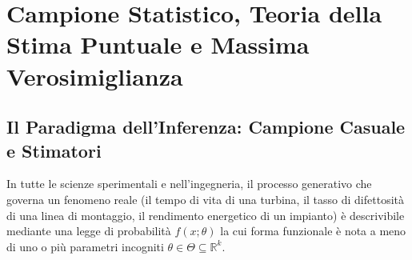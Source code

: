 \chapter{Campione Statistico, Teoria della Stima Puntuale e Massima Verosimiglianza}
\label{cap:campione_statistico_e_stimatori}

\begin{abstract}
Il presente capitolo segna il passaggio concettuale dall'analisi probabilistica diretta (deduttiva: dal modello teorico ai dati attesi) all'inferenza statistica (induttiva: dai dati empirici osservati alla stima dei parametri incogniti del modello). Viene formalizzata la nozione di campione casuale i.i.d. e stabilita la netta distinzione tra statistica, stimatore (variabile aleatoria) e stima (valore numerico realizzato). Si definiscono e si dimostrano i criteri di ottimalità degli stimatori: non distorsione (correttezza), scomposizione dell'Errore Quadratico Medio (MSE) nel trade-off tra distorsione e varianza, consistenza asintotica ed efficienza UMVUE mediante il Limite di Cramér-Rao (CRLB) e l'Informazione di Fisher. Si sviluppa in dettaglio il Metodo della Massima Verosimiglianza (MLE), dimostrandone le proprietà di invarianza e normalità asintotica. Infine, si espone il metodo Monte Carlo per l'integrazione stocastica con relativo codice R.
\end{abstract}

\section{Il Paradigma dell'Inferenza: Campione Casuale e Stimatori}
\label{sec:paradigma_inferenza}

In tutte le scienze sperimentali e nell'ingegneria, il processo generativo che governa un fenomeno reale (il tempo di vita di una turbina, il tasso di difettosità di una linea di montaggio, il rendimento energetico di un impianto) è descrivibile mediante una legge di probabilità $f(x; \theta)$ la cui forma funzionale è nota a meno di uno o più parametri incogniti $\theta \in \Theta \subseteq \mathbb{R}^k$.

